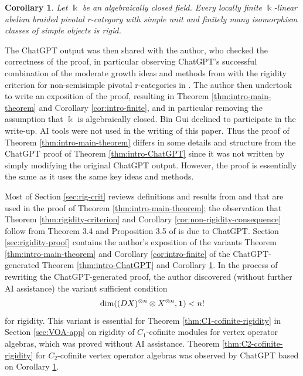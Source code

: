 \documentclass[11pt, reqno]{amsart}
\newtheorem{cor}[thm]{Corollary}
\theoremstyle{definition}\newtheorem{defi}[thm]{Definition}
\theoremstyle{definition}\newtheorem{rem}[thm]{Remark}
\theoremstyle{definition}\newtheorem{exam}[thm]{Example}
\theoremstyle{definition}\newtheorem{assum}[thm]{Assumption}
\newcommand{\vac}{\mathbf{1}}
\let\hom\relax
\DeclareMathOperator{\hom}{Hom}
\begin{document}
\begin{cor}\label{cor:intro-ChatGPT}
Let $\Bbbk$ be an algebraically closed
field. Every locally finite $\Bbbk$-linear abelian braided pivotal r-category with simple unit
and finitely many isomorphism classes of simple objects is rigid.
\end{cor}


The ChatGPT output was then shared with the author, who checked the correctness of the proof, in particular observing ChatGPT's successful combination of the moderate growth ideas and methods from \cite{EP} with the rigidity criterion for non-semisimple pivotal r-categories in \cite{McR}. The author then undertook to write an exposition of the proof, resulting in Theorem \ref{thm:intro-main-theorem} and Corollary \ref{cor:intro-finite}, and in particular removing the assumption that $\Bbbk$ is algebraically closed. Bin Gui declined to participate in the write-up. AI tools were not used in the writing of this paper. Thus the proof of Theorem \ref{thm:intro-main-theorem} differs in some details and structure from the ChatGPT proof of Theorem \ref{thm:intro-ChatGPT} since it was not written by simply modifying the original ChatGPT output. However, the proof is essentially the same as it uses the same key ideas and methods.

Most of Section \ref{sec:rig-crit} reviews definitions and results from \cite{BD} and \cite{McR} that are used in the proof of Theorem \ref{thm:intro-main-theorem}; the observation that Theorem \ref{thm:rigidity-criterion} and Corollary \ref{cor:non-rigidity-consequence} follow from Theorem 3.4 and Proposition 3.5 of \cite{McR} is due to ChatGPT. Section \ref{sec:rigidity-proof} contains the author's exposition of the variants Theorem \ref{thm:intro-main-theorem} and Corollary \ref{cor:intro-finite} of the ChatGPT-generated Theorem \ref{thm:intro-ChatGPT} and Corollary \ref{cor:intro-ChatGPT}. In the process of rewriting the ChatGPT-generated proof, the author discovered (without further AI assistance) the variant sufficient condition
\begin{equation*}
\dim\hom((DX)^{\otimes n}\otimes X^{\otimes n},\vac)<n!
\end{equation*}
for rigidity. This variant is essential for Theorem \ref{thm:C1-cofinite-rigidity} in Section \ref{sec:VOA-app} on rigidity of $C_1$-cofinite modules for vertex operator algebras, which was proved without AI assistance. Theorem \ref{thm:C2-cofinite-rigidity} for $C_2$-cofinite vertex operator algebras was observed by ChatGPT based on Corollary \ref{cor:intro-ChatGPT}.
\end{document}
